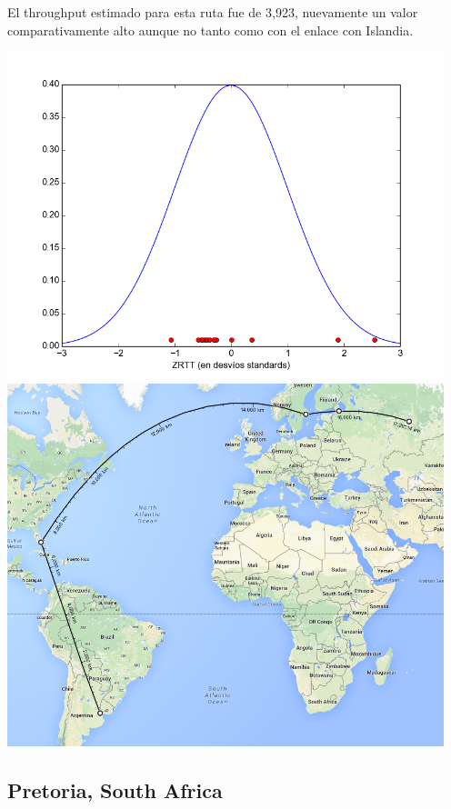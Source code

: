  El throughput estimado para esta ruta fue de 3,923, nuevamente un valor comparativamente alto aunque no tanto como con el enlace con Islandia.

 \includegraphics[width=5in]{imgs/perm_dist.png}
 \includegraphics[width=5in]{imgs/maps/perm.png}

\subsection{Pretoria, South Africa}

